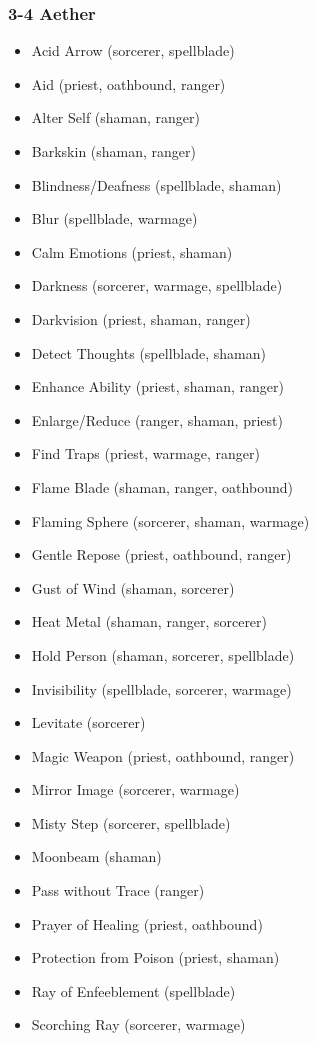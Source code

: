\subsubsection{3-4 Aether}
\begin{itemize}
\item Acid Arrow (sorcerer, spellblade)
\item Aid (priest, oathbound, ranger)
\item Alter Self (shaman, ranger)
\item Barkskin (shaman, ranger)
\item Blindness/Deafness (spellblade, shaman)
\item Blur (spellblade, warmage)
\item Calm Emotions (priest, shaman)
\item Darkness (sorcerer, warmage, spellblade)
\item Darkvision (priest, shaman, ranger)
\item Detect Thoughts (spellblade, shaman)
\item Enhance Ability (priest, shaman, ranger)
\item Enlarge/Reduce (ranger, shaman, priest)
\item Find Traps (priest, warmage, ranger)
\item Flame Blade (shaman, ranger, oathbound)
\item Flaming Sphere (sorcerer, shaman, warmage)
\item Gentle Repose (priest, oathbound, ranger)
\item Gust of Wind (shaman, sorcerer)
\item Heat Metal (shaman, ranger, sorcerer)
\item Hold Person (shaman, sorcerer, spellblade)
\item Invisibility (spellblade, sorcerer, warmage)
\item Levitate (sorcerer)
\item Magic Weapon (priest, oathbound, ranger)
\item Mirror Image (sorcerer, warmage)
\item Misty Step (sorcerer, spellblade)
\item Moonbeam (shaman)
\item Pass without Trace (ranger)
\item Prayer of Healing (priest, oathbound)
\item Protection from Poison (priest, shaman)
\item Ray of Enfeeblement (spellblade)
\item Scorching Ray (sorcerer, warmage)

\end{itemize}
